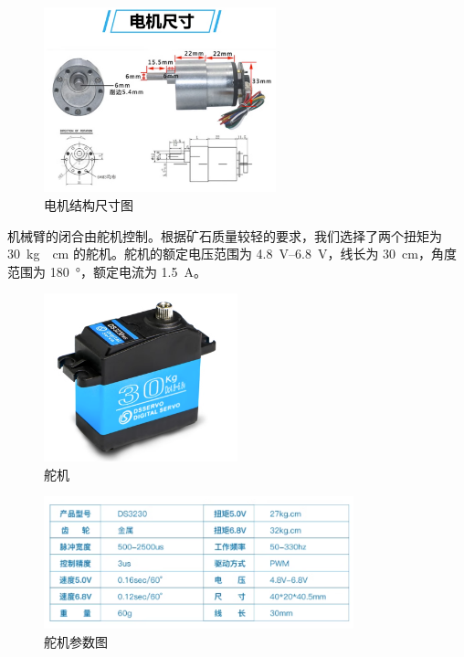 \documentclass[10pt]{ctexart}
\begin{document}
\begin{figure}[H]
    \centering
    \includegraphics[width=0.6\textwidth]{motor/motor_parameter3.png}
    \caption{电机结构尺寸图}
    \label{fig:motor_parameter3}
\end{figure}

机械臂的闭合由舵机控制。根据矿石质量较轻的要求，我们选择了两个扭矩为 \SI{30}{\kilogram\cdot\centi\meter} 的舵机。舵机的额定电压范围为 \SIrange{4.8}{6.8}{\volt}，线长为 \SI{30}{\centi\meter}，角度范围为 \SI{180}{\degree}，额定电流为 \SI{1.5}{\ampere}。


\begin{figure}[H]
    \centering
    \includegraphics[width=0.5\textwidth]{motor/steer_motor.png}
    \caption{舵机}
    \label{fig:steer_motor}
\end{figure}

\begin{figure}[H]
    \centering
    \includegraphics[width=0.8\textwidth]{motor/steer_motor_parameter.png}
    \caption{舵机参数图}
    \label{fig:steer_motor_parameter}
\end{figure}
\end{document}
